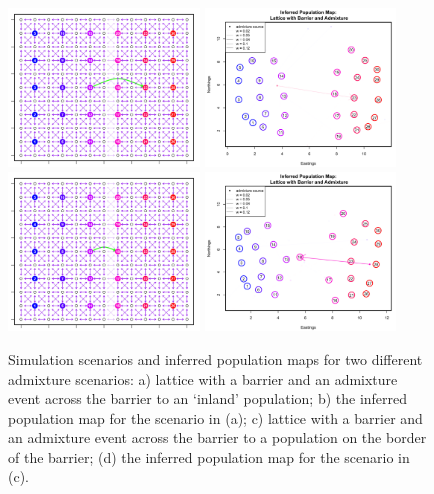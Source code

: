 \documentclass[12pt]{article}
\begin{document}
\begin{figure}[ht!]
	\centering
			{\includegraphics[width=2in,height=1.66in]{figs/sims/barr_indland_ad_lattice.png}}
			{\includegraphics[width=2in,height=1.66in]{figs/sims/GeoGenMap_barr_inland_admixture_1.png}}
			{\includegraphics[width=2in,height=1.66in]{figs/sims/big_barr_ad_lattice.png}}
			{\includegraphics[width=2in,height=1.66in]{figs/sims/GeoGenMap_big_barr_ad_1.png}}
	\caption{Simulation scenarios and inferred population maps for two different admixture scenarios: a) lattice with a barrier and an admixture event across the barrier to an `inland' population; b) the inferred population map for the scenario in (a); c) lattice with a barrier and an admixture event across the barrier to a population on the border of the barrier; (d) the inferred population map for the scenario in (c).}\label{sfig:barr_inland_ad}
\end{figure}
\end{document}
